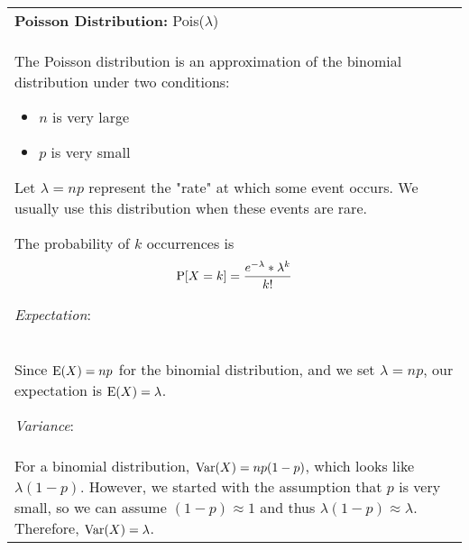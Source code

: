 {\tabulinesep=1mm
\begin{tabu}{|p{16cm} |}
\hline
\textbf{Poisson Distribution:} Pois($\lambda$) \\
The Poisson distribution is an approximation of the binomial distribution under two conditions:
\begin{itemize}
	\item{$n$ is very large}
	\item{$p$ is very small}
\end{itemize}

Let $\lambda = np$ represent the "rate" at which some event occurs. We usually use this distribution when these events are rare. 

The probability of $k$ occurrences is 
$$ \P[X = k] = \frac{e^{-\lambda} * \lambda^k}{k!} $$

\textit{Expectation}: \\
Since $\E(X) = np$ for the binomial distribution, and we set $\lambda = np$, our expectation is $\E(X) = \lambda$.
 
\textit{Variance}: \\
For a binomial distribution, $\var(X) = np(1-p)$, which looks like $\lambda (1-p)$. However, we started with the assumption that $p$ is very small, so we can assume $(1-p) \approx 1$ and thus $\lambda (1-p) \approx \lambda$. Therefore, $\var(X) = \lambda$. 
\\
\hline
\end{tabu}
}

\begin{comment}
It turns out that the expectation and variance of the Poisson distribution are both equal to $\lambda$. 
This will be clear after we walk through the derivation of the Poisson distribution.

\textit{Derivation}: \\
Recall, $\lambda = np$. Also, recall from calculus we have $\lim_{n \rightarrow \infty} \left(1 + \frac{x}{n}\right)^n = e^x$, implying that $\lim_{n \rightarrow \infty} \left(1 -\frac{\alpha}{n}\right)^n = e^{- \alpha}$. We will also use the fact that for large $n$, $\frac{n!}{(n-k)!} \approx n^k$. We will use these facts below.
\begin{align}
\P[X = k] &= {n \choose k} * p^k * (1 - p)^{n - k} \\ 
&= \frac{n!}{k! * (n - k)!} * p^k * (1 - p)^{n - k} \\
&\approx \frac{n^k * p^k}{k!} * (1 - \frac{\lambda}{n})^{n-k} \\
&\approx \frac{\lambda^k * e^{-\lambda}}{k!}
\end{align}
Since we started with a binomial distribution, our expectation and variance should remain the same.
\end{comment}

